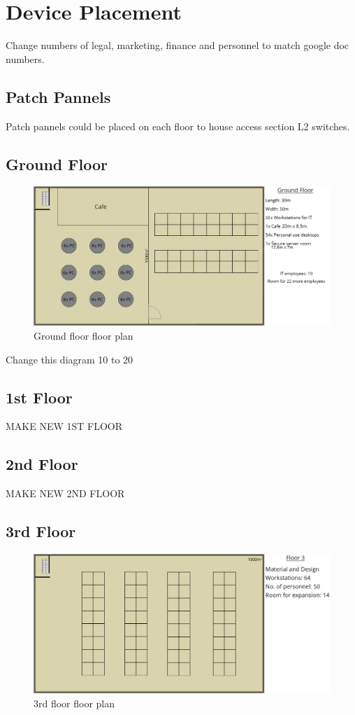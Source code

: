 \section{Device Placement}
Change numbers of legal, marketing, finance and personnel to match google doc numbers.
\subsection{Patch Pannels}
Patch pannels could be placed on each floor to house access section L2 switches.
\subsection{Ground Floor}
\begin{figure}[ht!]
    \includegraphics[width=15cm]{Figures/ground.png}
    \caption{Ground floor floor plan}
    \label{ground_floor}
\end{figure}
Change this diagram 10 to 20
\subsection{1st Floor}
\begin{huge}
    MAKE NEW 1ST FLOOR
\end{huge}
\subsection{2nd Floor}
\begin{huge}
    MAKE NEW 2ND FLOOR
\end{huge}
\subsection{3rd Floor}
\begin{figure}[h]
    \includegraphics[width=15cm]{Figures/3rd-Floor.png}
    \caption{3rd floor floor plan}
    \label{3rd_floor}
\end{figure}
